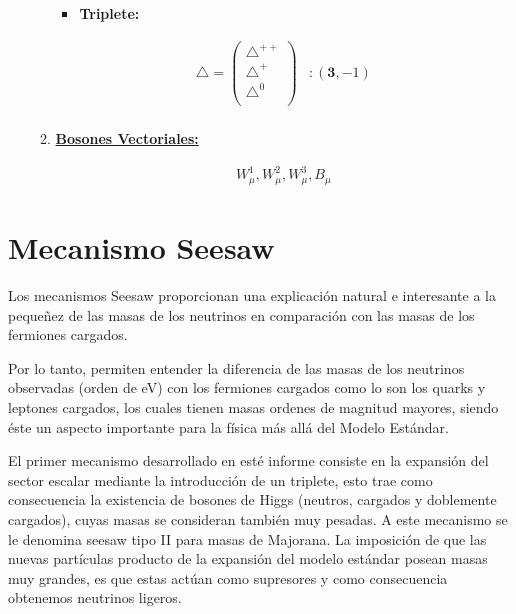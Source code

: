 \documentclass[12pt]{article}
\begin{document}
\begin{enumerate}
\begin{enumerate}
\begin{itemize}
\item \textbf{Triplete:}
\end{itemize}

\begin{equation}
\begin{aligned}
\label{eq:11}
 \triangle= \begin{pmatrix} \triangle^{++}   \\ \triangle^{+}  \\  \triangle^{0} \\ \end{pmatrix} & :  (\textbf{3}, -1) \\ 
\end{aligned}
\end{equation}


\item\underline{ \textbf{Bosones Vectoriales:}}


\begin{equation}
\begin{aligned}
 W_\mu^{1}, W_\mu^{2}, W_\mu^{3}, B_\mu 
\end{aligned}
\end{equation}
\end{enumerate}
\end{enumerate}


\section{Mecanismo Seesaw}

Los mecanismos Seesaw proporcionan una explicación natural e interesante a la pequeñez de las masas de los neutrinos en comparación
con las masas de los fermiones cargados. 


Por lo tanto, permiten entender la diferencia de las masas de los neutrinos observadas (orden de eV) con los fermiones cargados como lo son los quarks y leptones cargados, los cuales tienen masas ordenes de magnitud mayores, siendo éste un aspecto importante para la física más allá del Modelo Estándar.   

El primer mecanismo desarrollado en esté informe consiste  en la expansión del sector escalar mediante la introducción de un triplete, esto trae como consecuencia la existencia de bosones de Higgs (neutros, cargados y doblemente cargados), cuyas masas se consideran también muy pesadas. A este mecanismo se le denomina seesaw tipo II para masas de Majorana. La imposición de que las nuevas partículas producto de la expansión del modelo estándar posean masas muy grandes, es que estas actúan como supresores y como consecuencia obtenemos neutrinos ligeros.
\end{document}

